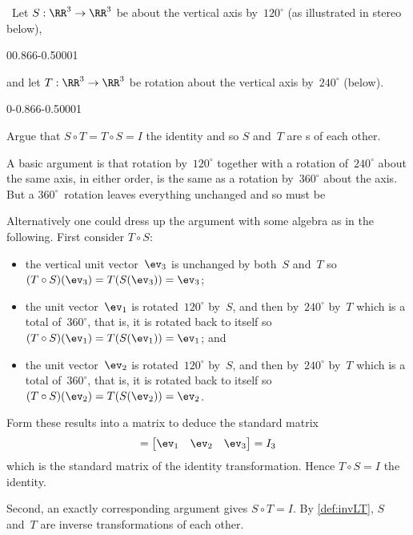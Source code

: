 \begin{example} \ 
Let \(S:\RR^3\to\RR^3\) be  about the vertical axis by~\(120^\circ\) (as illustrated in stereo below), 
\begin{center}
0{0.866}{-0.5}0001
\end{center}
and let \(T:\RR^3\to\RR^3\) be rotation about the vertical axis by~\(240^\circ\) (below).
\begin{center}
0{-0.866}{-0.5}0001
\end{center}
Argue that \(S\circ T=T\circ S=I\) the identity and so \(S\) 
and~\(T\) are s of each other.
\begin{solution} 
A basic argument is that rotation by~\(120^\circ\) together with a rotation of~\(240^\circ\) about the same axis, in either order, is the same as a rotation by~\(360^\circ\) about the axis.
But a \(360^\circ\)~rotation leaves everything unchanged and so must be \text{the identity.}

Alternatively one could dress up the argument with some algebra as in the following.
First consider \(T\circ S\):
\begin{itemize}
\item the vertical unit vector~\(\ev_3\) is unchanged by both~\(S\) and~\(T\) so \((T\circ S)(\ev_3)=T(S(\ev_3))=\ev_3\);
\item the unit vector~\(\ev_1\) is rotated~\(120^\circ\) by~\(S\), and then by~\(240^\circ\) by~\(T\) which is a total of~\(360^\circ\), that is, it is rotated back to itself so \((T\circ S)(\ev_1)=T(S(\ev_1))=\ev_1\); and
\item the unit vector~\(\ev_2\) is rotated~\(120^\circ\) by~\(S\), and then by~\(240^\circ\) by~\(T\) which is a total of~\(360^\circ\), that is, it is rotated back to itself so \((T\circ S)(\ev_2)=T(S(\ev_2))=\ev_2\).
\end{itemize}
Form these results into a matrix to deduce the standard matrix
\begin{equation*}
[T\circ S]=\begin{bmatrix} \ev_1&\ev_2&\ev_3 \end{bmatrix}
=I_3
\end{equation*}
which is the standard matrix of the identity transformation.
Hence \(T\circ S=I\) the identity.

Second, an exactly corresponding argument gives  \(S\circ T=I\).
By \cref{def:invLT}, \(S\) and~\(T\) are inverse transformations of each other.
\end{solution}
\end{example}



